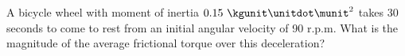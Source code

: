 A bicycle wheel with moment of inertia 
$0.15\ \kgunit\unitdot\munit^2$ takes 30 seconds to come to rest from an
initial angular velocity of 90 r.p.m. What is the magnitude of the
average frictional torque over this deceleration?
